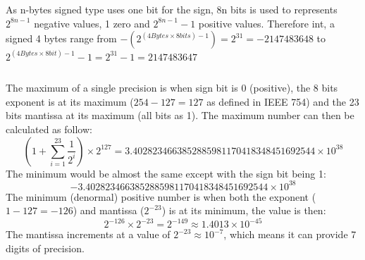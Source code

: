 \documentclass{article}
\begin{document}
\begin{table}[H]
    \centering
\end{table}

\setcounter{section}{5}
\section{}
\subsection{}
As n-bytes signed type uses one bit for the sign, 8n bits is used to represents $2^{8n-1}$ negative values, 1 zero and $2^{8n-1}-1$ positive values. Therefore int, a signed 4 bytes range from $-(2^{(4Bytes\times8bits)-1})=2^{31}=-2147483648$ to $2^{(4Bytes\times8bit)-1}-1=2^{31}-1=2147483647$
\subsection{}
The maximum of a single precision is when sign bit is 0 (positive), the 8 bits exponent is at its maximum ($254-127=127$ as defined in IEEE 754) and the 23 bits mantissa at its maximum (all bits as 1). The maximum number can then be calculated as follow: $$(1+\sum_{i=1}^{23}\frac{1}{2^i})\times2^{127}=3.4028234663852885981170418348451692544\times10^{38}$$
The minimum would be almost the same except with the sign bit being 1:
$$-3.4028234663852885981170418348451692544\times10^{38}$$
The minimum (denormal) positive number is when both the exponent ($1-127=-126$) and mantissa ($2^{-23}$) is at its minimum, the value is then:
$$2^{-126}\times2^{-23}=2^{-149}\approx1.4013\times10^{-45}$$
The mantissa increments at a value of $2^{-23}\approx10^{-7}$, which means it can provide 7 digits of precision.
\end{document}
